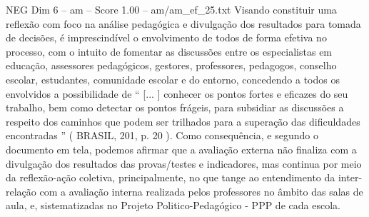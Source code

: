 \begin{textsample}{NEG Dim 6 – am – Score 1.00 – am/am\_ef\_25.txt}
Visando constituir uma reflexão com foco na análise pedagógica e divulgação dos resultados para tomada de decisões, é imprescindível o envolvimento de todos de forma efetiva no processo, com o intuito de fomentar as discussões entre os especialistas em educação, assessores pedagógicos, gestores, professores, pedagogos, conselho escolar, estudantes, comunidade escolar e do entorno, concedendo a todos os envolvidos a possibilidade de “ [... ] conhecer os pontos fortes e eficazes do seu trabalho, bem como detectar os pontos frágeis, para subsidiar as discussões a respeito dos caminhos que podem ser trilhados para a superação das dificuldades encontradas ” ( BRASIL, 201, p. 20 ).
Como consequência, e segundo o documento em tela, podemos afirmar que a avaliação externa não finaliza com a divulgação dos resultados das provas/testes e indicadores, mas continua por meio da reflexão-ação coletiva, principalmente, no que tange ao entendimento da inter-relação com a avaliação interna realizada pelos professores no âmbito das salas de aula, e, sistematizadas no Projeto Politico-Pedagógico - PPP de cada escola.

\end{textsample}
